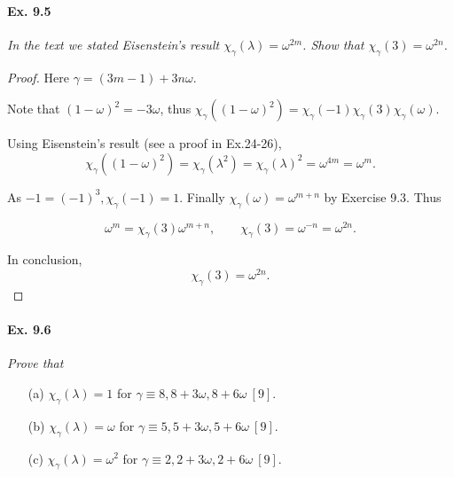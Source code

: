 \documentclass[11pt,a4paper]{article}
\begin{document}
\paragraph{Ex. 9.5}
{\it In the text we stated Eisenstein's result $\chi_\gamma(\lambda) = \omega^{2m}$. Show that $\chi_{\gamma}(3) = \omega^{2n}$.
}

\begin{proof} Here $\gamma = (3m-1) + 3n\omega$.

Note that $(1-\omega)^2 = -3 \omega$, thus $\chi_\gamma((1-\omega)^2) = \chi_\gamma(-1)\chi_\gamma(3)\chi_\gamma(\omega)$.

Using Eisenstein's result (see a proof in Ex.24-26),
$$\chi_\gamma((1-\omega)^2)= \chi_\gamma(\lambda^2) =\chi_\gamma(\lambda)^2 =\omega^{4m} = \omega^m.$$

As $-1 = (-1)^3, \chi_\gamma(-1) = 1$. Finally  $\chi_\gamma(\omega) = \omega^{m+n}$ by Exercise 9.3. Thus

$$\omega^m = \chi_\gamma(3) \omega^{m+n},\qquad  \chi_\gamma(3) = \omega^{-n} = \omega^{2n}.$$

In conclusion,
$$\chi_\gamma(3) = \omega^{2n}.$$
\end{proof}

\paragraph{Ex. 9.6}

{\it Prove that
\begin{enumerate}
\item[(a)] $\chi_\gamma(\lambda) = 1$ for $\gamma \equiv 8, 8 + 3\omega, 8 + 6 \omega \ [9]$.
\item[(b)] $\chi_\gamma(\lambda) = \omega$ for $\gamma \equiv 5, 5 + 3\omega, 5 + 6 \omega \ [9]$.
\item[(c)]$\chi_\gamma(\lambda) = \omega^2$ for $\gamma \equiv 2, 2 + 3\omega, 2 + 6 \omega \ [9]$.
\end{enumerate}
}
\end{document}

